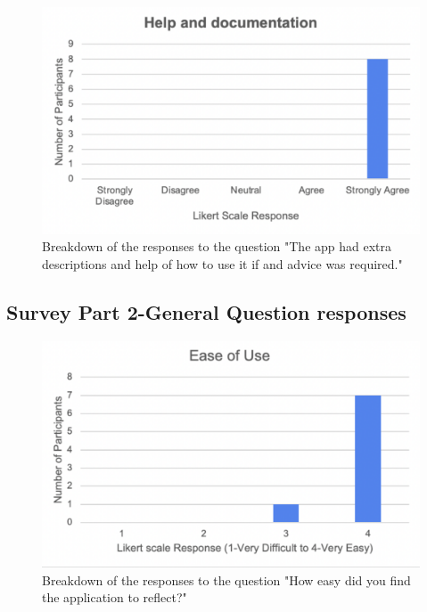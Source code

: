 \documentclass{l4proj}
\begin{document}
\begin{appendices}
\begin{figure}[H]
    \begin{centering}
    \includegraphics[scale=0.5]{images/heuristic10.pdf}
    \caption{Breakdown of the responses to the question "The app had extra descriptions and help of how to use it if and advice was required."}
    \label{fig: heuristic10}
    \end{centering}
\end{figure}

\subsection{Survey Part 2-General Question responses}

\begin{figure}[H]
    \begin{centering}
    \includegraphics[scale=0.5]{images/userSurvey5.pdf}
    \caption{Breakdown of the responses to the question "How easy did you find the application to reflect?"}
    \label{fig: userSurvey5}
    \end{centering}
\end{figure}


\end{appendices}
\end{document}
